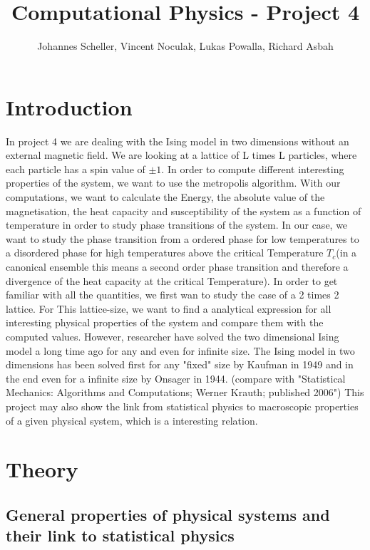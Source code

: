 \documentclass[10pt,a4paper]{article}
\author{Johannes Scheller, Vincent Noculak, Lukas Powalla, Richard Asbah}
\title{Computational Physics - Project 4}
\begin{document}
\maketitle
\newpage
\tableofcontents
\newpage

\section*{Introduction}
In project 4 we are dealing with the Ising model in two dimensions without an external magnetic field. We are looking at a lattice of L times L particles, where each particle has a spin value of $\pm 1$. In order to compute different interesting properties of the system, we want to use the metropolis algorithm.  With our computations, we want to calculate the Energy, the absolute value of the magnetisation, the heat capacity and susceptibility of the system as a function of temperature in order to study phase transitions of the system. 
In our case, we want to study the phase transition from a ordered phase for low temperatures to a disordered phase for high temperatures above the critical Temperature $T_c$(in a canonical ensemble this means a second order phase transition and therefore a divergence of the heat capacity at the critical Temperature).
In order to get familiar with all the quantities, we first wan to study the case of a 2 times 2 lattice. For This lattice-size, we want to find a analytical expression for all interesting physical properties of the system and compare them with the computed values.
However, researcher have solved the two dimensional Ising model a long time ago for any and even for infinite size.
The Ising model in two dimensions has been solved first for any "fixed" size by Kaufman in 1949 and in the end even for a infinite size by Onsager in 1944.  (compare with "Statistical Mechanics: Algorithms and Computations; Werner Krauth; published 2006")
This project may also show the link from statistical physics to macroscopic properties of a given physical system, which is a interesting relation.
\section{Theory}

\subsection{General properties of physical systems and their link to statistical physics}
\end{document}
